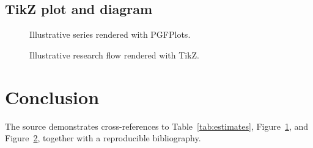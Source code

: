 \documentclass[11pt,a4paper]{report}
\begin{document}
\section{TikZ plot and diagram}
\begin{figure}[H]
  \centering
  
  \caption{Illustrative series rendered with PGFPlots.}
  \label{fig:plot}
\end{figure}
\begin{figure}[H]
  \centering
  
  \caption{Illustrative research flow rendered with TikZ.}
  \label{fig:diagram}
\end{figure}

\chapter{Conclusion}
The source demonstrates cross-references to Table~\ref{tab:estimates}, Figure~\ref{fig:plot}, and Figure~\ref{fig:diagram}, together with a reproducible bibliography.



\end{document}
